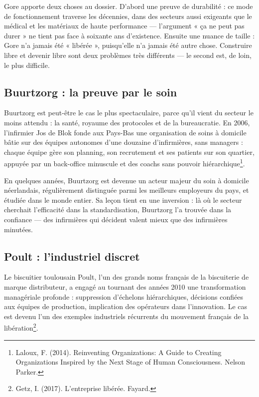 Gore apporte deux choses au dossier. D'abord une preuve de durabilité : ce mode de fonctionnement traverse les décennies, dans des secteurs aussi exigeants que le médical et les matériaux de haute performance — l'argument « ça ne peut pas durer » ne tient pas face à soixante ans d'existence. Ensuite une nuance de taille : Gore n'a jamais été « libérée », puisqu'elle n'a jamais été autre chose. Construire libre et devenir libre sont deux problèmes très différents — le second est, de loin, le plus difficile.

\subsection{Buurtzorg : la preuve par le soin}

Buurtzorg est peut-être le cas le plus spectaculaire, parce qu'il vient du secteur le moins attendu : la santé, royaume des protocoles et de la bureaucratie. En 2006, l'infirmier Jos de Blok fonde aux Pays-Bas une organisation de soins à domicile bâtie sur des équipes autonomes d'une douzaine d'infirmières, sans managers : chaque équipe gère son planning, son recrutement et ses patients sur son quartier, appuyée par un back-office minuscule et des coachs sans pouvoir hiérarchique\footnote{Laloux, F. (2014). Reinventing Organizations: A Guide to Creating Organizations Inspired by the Next Stage of Human Consciousness. Nelson Parker.}.

En quelques années, Buurtzorg est devenue un acteur majeur du soin à domicile néerlandais, régulièrement distinguée parmi les meilleurs employeurs du pays, et étudiée dans le monde entier. Sa leçon tient en une inversion : là où le secteur cherchait l'efficacité dans la standardisation, Buurtzorg l'a trouvée dans la confiance — des infirmières qui décident valent mieux que des infirmières minutées.

\subsection{Poult : l'industriel discret}

Le biscuitier toulousain Poult, l'un des grands noms français de la biscuiterie de marque distributeur, a engagé au tournant des années 2010 une transformation managériale profonde : suppression d'échelons hiérarchiques, décisions confiées aux équipes de production, implication des opérateurs dans l'innovation. Le cas est devenu l'un des exemples industriels récurrents du mouvement français de la libération\footnote{Getz, I. (2017). L'entreprise libérée. Fayard.}.


